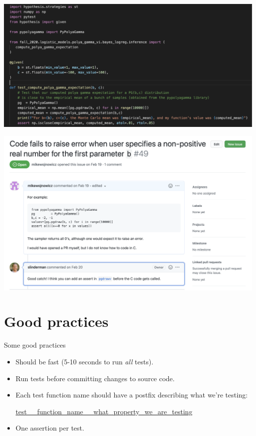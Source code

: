 \documentclass[10pt]{beamer}
\begin{document}
\begin{frame}
\begin{center}
\includegraphics[width=\textwidth]{images/pypolyagamma_test}	
\end{center}
	
\end{frame}

\begin{frame}
\begin{center}
\includegraphics[width=\textwidth]{images/pypolyagamma_issue}	
\end{center}
	
\end{frame}

\section{Good practices}
\begin{frame}{Some good practices}

\begin{itemize}
\item Should be \alert{fast} (5-10 seconds to run \textit{all} tests).
\item Run tests before committing changes to source code. 
\item Each test function name should have a postfix describing what we're testing:
	\begin{center}\url{test__function_name__what_property_we_are_testing}	
	\end{center}
\item One assertion per test.
\end{itemize} 
\end{frame}
\end{document}
